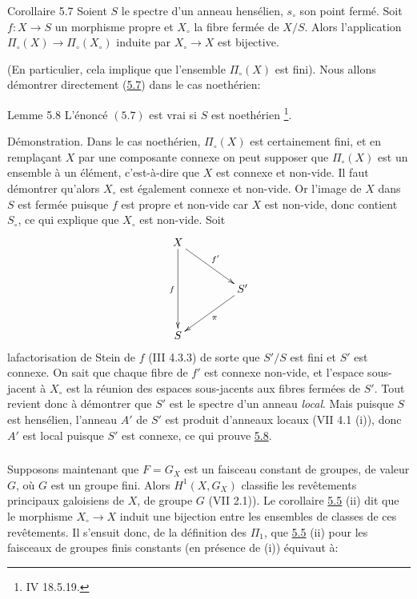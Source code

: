 \documentclass[10pt]{../fichiers-configuration-latex/smfart}
\begin{document}
\begin{enonce*}{Corollaire 5.7}
Soient $S$ le spectre d'un anneau hensélien, $s_{\circ}$ son point
fermé. Soit $f:X\rightarrow S$ un morphisme propre et $X_{\circ}$ la
fibre fermée de $X/S$. Alors l'application $\Pi_{\circ}(X)\rightarrow
\Pi_{\circ}(X_{\circ})$ induite par $X_{\circ}\rightarrow X$ est
bijective.
\end{enonce*}

(En particulier, cela implique que l'ensemble $\Pi_{\circ}(X)$ est
fini). Nous allons démontrer directement (\hyperref[XII.cor5.7]{5.7}) dans le cas noethérien:

\begin{enonce*}{Lemme 5.8}
L'énoncé $(5.7)$ est vrai si $S$ est noethérien \footnote[1]{\Cf \EGA
  IV 18.5.19.}.
\end{enonce*}

Démonstration. Dans le cas noethérien, $\Pi_{\circ}(X)$ est
certainement fini, et en remplaçant $X$ par une composante connexe
on peut supposer que $\Pi_{\circ}(X)$ est un ensemble à un élément,
c'est-à-dire que $X$ est connexe et non-vide. Il faut démontrer
qu'alors $X_{\circ}$ est également connexe et non-vide. Or l'image de
$X$ dans $S$ est fermée puisque $f$ est propre et non-vide car $X$ est
non-vide, donc contient $S_{\circ}$, ce qui explique que $X_{\circ}$
est non-vide. Soit
$$
\xymatrix@R=1cm@C=1.5cm{
X \ar[rd]^{f'} \ar[dd]_{f}& \\
  & S'\ar[ld]^{\pi}\\
S & 
}
$$
la\pageoriginale factorisation de Stein de $f$ (\EGA III 4.3.3) de
sorte que $S'/S$ est fini et $S'$ est connexe. On sait que chaque
fibre de $f'$ est connexe non-vide, et l'espace sous-jacent à
$X_{\circ}$ est la réunion des espaces sous-jacents aux fibres fermées
de $S'$. Tout revient donc à démontrer que $S'$ est le spectre d'un
anneau \emph{local}. Mais puisque $S$ est hensélien, l'anneau $A'$ de
$S'$ est produit d'anneaux locaux (VII 4.1 (i)), donc $A'$ est local
puisque $S'$ est connexe, ce qui prouve \hyperref[XII.lem5.8]{5.8}.

\setcounter{subsection}{9}
\setcounter{subsubsection}{-1}
\subsubsection{}
Supposons maintenant que $F=G_X$ est un faisceau constant de groupes,
de valeur $G$, où $G$ est un groupe fini. Alors $H^1(X,G_X)$ classifie
les revêtements principaux galoisiens de $X$, de groupe $G$ (VII
2.1)). Le corollaire \hyperref[XII.cor5.5]{5.5} (ii) dit que le morphisme
$X_{\circ}\rightarrow X$ induit une bijection entre les ensembles de
classes de ces revêtements. Il s'ensuit donc, de la définition des
$\Pi_1$, que \hyperref[XII.cor5.5]{5.5} (ii) pour les faisceaux de groupes finis constants
(en présence de (i)) équivaut à:
\end{document}
